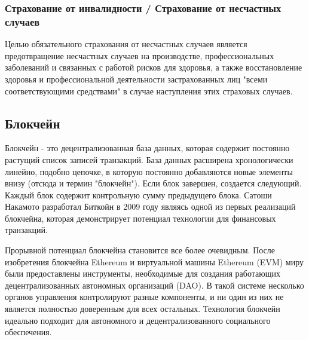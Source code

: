 \subsubsection*{Страхование от инвалидности / Страхование от несчастных случаев}
Целью обязательного страхования от несчастных случаев является предотвращение несчастных случаев на производстве, профессиональных заболеваний и связанных с работой рисков для здоровья, а также восстановление здоровья и профессиональной деятельности застрахованных лиц "всеми соответствующими средствами" в случае наступления этих страховых случаев.

\subsection{Блокчейн}
Блокчейн - это децентрализованная база данных, которая содержит постоянно растущий список записей транзакций. База данных расширена хронологически линейно, подобно цепочке, в которую постоянно добавляются новые элементы внизу (отсюда и термин "блокчейн"). Если блок завершен, создается следующий. Каждый блок содержит контрольную сумму предыдущего блока. Сатоши Накамото разработал Биткойн в 2009 году являясь одной из первых реализаций блокчейна, которая демонстрирует потенциал технологии для финансовых транзакций. \cite{bitcoin}

Прорывной потенциал блокчейна становится все более очевидным. После изобретения блокчейна Ethereum и виртуальной машины Ethereum (EVM) миру были предоставлены инструменты, необходимые для создания работающих децентрализованных автономных организаций (DAO). В такой системе несколько органов управления контролируют разные компоненты, и ни один из них не является полностью доверенным для всех остальных. \cite{cammarden} Технология блокчейн идеально подходит для автономного и децентрализованного социального обеспечения.